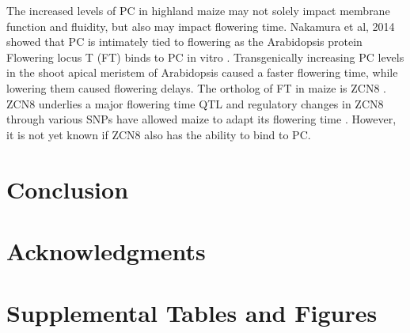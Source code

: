 \documentclass[9pt,twocolumn,twoside]{BioRxiv}
\begin{document}
The increased levels of PC in highland maize may not solely impact membrane function and fluidity, but also may impact flowering time. Nakamura et al, 2014 showed that PC is intimately tied to flowering as the Arabidopsis protein Flowering locus T (FT) binds to PC in vitro \cite{Nakamura2014-qf}.  Transgenically increasing PC levels in the shoot apical meristem of Arabidopsis caused a faster flowering time, while lowering them caused flowering delays. The ortholog of FT in maize is ZCN8 \cite{Lazakis2011-nq}. ZCN8 underlies a major flowering time QTL and regulatory changes in ZCN8 through various SNPs have allowed maize to adapt its flowering time \cite{Guo2019-pn}. However, it is not yet known if ZCN8 also has the ability to bind to PC.

\section{Conclusion}
\label{sec:discussion}

\section{Acknowledgments}
\label{sec:acknowledgments}



\section*{Supplemental Tables and Figures}

\renewcommand{\thefigure}{S\arabic{figure}}
\renewcommand{\thetable}{S\arabic{table}}%
\linenumbers
\end{document}
